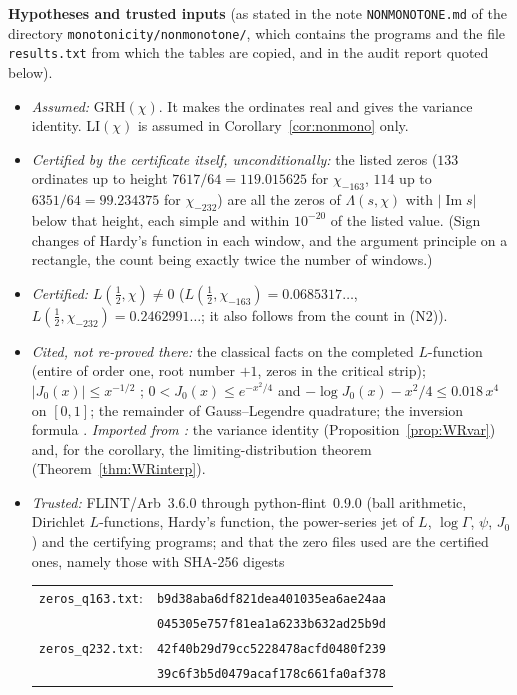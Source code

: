\documentclass[11pt]{amsart}
\theoremstyle{definition}
\numberwithin{equation}{section}
\newcommand{\im}{\operatorname{Im}}
\begin{document}
\noindent\textbf{Hypotheses and trusted inputs} (as stated in the note
\texttt{NONMONOTONE.md} of the directory
\texttt{monotonicity/nonmonotone/}, which contains the programs and the
file \texttt{results.txt} from which the tables are copied, and in the
audit report quoted below).
\begin{itemize}
\item[\textup{(N1)}] \emph{Assumed:} GRH$(\chi)$. It makes the
ordinates real and gives the variance identity. LI$(\chi)$ is assumed
in Corollary~\ref{cor:nonmono} only.
\item[\textup{(N2)}] \emph{Certified by the certificate itself,
unconditionally:} the listed zeros ($133$ ordinates up to height
$7617/64=119.015625$ for $\chi_{-163}$, $114$ up to
$6351/64=99.234375$ for $\chi_{-232}$) are all the zeros of
$\Lambda(s,\chi)$ with $|\im s|$ below that height, each simple and
within $10^{-20}$ of the listed value. (Sign changes of Hardy's
function in each window, and the argument principle on a rectangle,
the count being exactly twice the number of windows.)
\item[\textup{(N3)}] \emph{Certified:} $L(\tfrac12,\chi)\ne0$
($L(\tfrac12,\chi_{-163})=0.0685317\ldots$,
$L(\tfrac12,\chi_{-232})=0.2462991\ldots$; it also follows from the
count in (N2)).
\item[\textup{(N4)}] \emph{Cited, not re-proved there:} the classical
facts on the completed $L$-function (entire of order one, root number
$+1$, zeros in the critical strip); $|J_0(x)|\le x^{-1/2}$
\cite[\S13.74]{Wat44}; $0<J_0(x)\le e^{-x^2/4}$ and
$-\log J_0(x)-x^2/4\le0.018\,x^4$ on $[0,1]$; the remainder of
Gauss--Legendre quadrature; the inversion formula
\cite[Lemma~7(b)]{WR}. \emph{Imported from \cite{WR}:} the variance
identity (Proposition~\ref{prop:WRvar}) and, for the corollary, the
limiting-distribution theorem (Theorem~\ref{thm:WRinterp}).
\item[\textup{(N5)}] \emph{Trusted:} FLINT/Arb~3.6.0 through
python-flint~0.9.0 (ball arithmetic, Dirichlet $L$-functions, Hardy's
function, the power-series jet of $L$, $\log\Gamma$, $\psi$,
$J_0$) and the certifying programs; and that the zero files used
are the certified ones, namely those with SHA-256 digests
\begin{center}
\small
\begin{tabular}{ll}
\texttt{zeros\_q163.txt}: & \texttt{b9d38aba6df821dea401035ea6ae24aa}\\
                          & \texttt{045305e757f81ea1a6233b632ad25b9d}\\
\texttt{zeros\_q232.txt}: & \texttt{42f40b29d79cc5228478acfd0480f239}\\
                          & \texttt{39c6f3b5d0479acaf178c661fa0af378}
\end{tabular}
\end{center}
\end{itemize}
\end{document}
